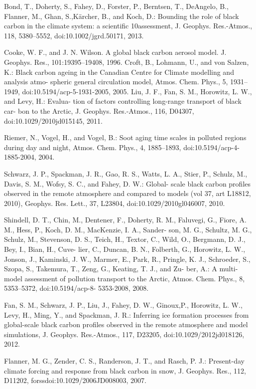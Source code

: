 \documentclass[12pt]{article}
\begin{document}
Bond, T., Doherty, S., Fahey, D., Forster, P., Berntsen, T., DeAngelo, B., Flanner, M., Ghan, S.,Kärcher, B., and Koch, D.: Bounding the role of black carbon in the climate system: a scientific 10assessment, J. Geophys. Res.-Atmos., 118, 5380–5552, doi:10.1002/jgrd.50171, 2013.

Cooke, W. F., and J. N. Wilson. A global black carbon aerosol model. J. Geophys. Res., 101:19395–19408, 1996.
Croft, B., Lohmann, U., and von Salzen, K.: Black carbon ageing in the Canadian Centre for Climate modelling and analysis atmo- spheric general circulation model, Atmos. Chem. Phys., 5, 1931– 1949, doi:10.5194/acp-5-1931-2005, 2005. 
Liu, J. F., Fan, S. M., Horowitz, L. W., and Levy, H.: Evalua- tion of factors controlling long-range transport of black car- bon to the Arctic, J. Geophys. Res.-Atmos., 116, D04307, doi:10.1029/2010jd015145, 2011. 

Riemer, N., Vogel, H., and Vogel, B.: Soot aging time scales in polluted regions during day and night, Atmos. Chem. Phys., 4, 1885–1893, doi:10.5194/acp-4-1885-2004, 2004. 

Schwarz, J. P., Spackman, J. R., Gao, R. S., Watts, L. A., Stier, P., Schulz, M., Davis, S. M., Wofsy, S. C., and Fahey, D. W.: Global- scale black carbon profiles observed in the remote atmosphere and compared to models (vol 37, art L18812, 2010), Geophys. Res. Lett., 37, L23804, doi:10.1029/2010gl046007, 2010. 

Shindell, D. T., Chin, M., Dentener, F., Doherty, R. M., Faluvegi, G., Fiore, A. M., Hess, P., Koch, D. M., MacKenzie, I. A., Sander- son, M. G., Schultz, M. G., Schulz, M., Stevenson, D. S., Teich, H., Textor, C., Wild, O., Bergmann, D. J., Bey, I., Bian, H., Cuve- lier, C., Duncan, B. N., Folberth, G., Horowitz, L. W., Jonson, J., Kaminski, J. W., Marmer, E., Park, R., Pringle, K. J., Schroeder, S., Szopa, S., Takemura, T., Zeng, G., Keating, T. J., and Zu- ber, A.: A multi-model assessment of pollution transport to the Arctic, Atmos. Chem. Phys., 8, 5353–5372, doi:10.5194/acp-8- 5353-2008, 2008. 

Fan, S. M., Schwarz, J. P., Liu, J., Fahey, D. W., Ginoux,P., Horowitz, L. W., Levy, H., Ming, Y., and Spackman, J. R.: Inferring ice formation processes from global-scale black carbon profiles observed in the remote atmosphere and model simulations, J. Geophys. Res.-Atmos., 117, D23205, doi:10.1029/2012jd018126, 2012.

Flanner, M. G., Zender, C. S., Randerson, J. T., and Rasch, P. J.: Present-day climate forcing and response from black carbon in snow, J. Geophys. Res., 112, D11202, forssdoi:10.1029/2006JD008003, 2007.
\end{document}
